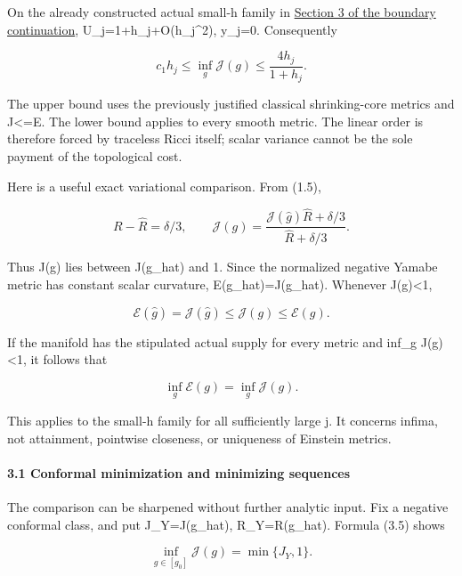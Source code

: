 \documentclass[
  10pt,
]{article}
\begin{document}
On the already constructed actual small-h family in
\href{20260926_boundary_compatibility.md}{Section 3 of the boundary
continuation}, U\_j=1+h\_j+O(h\_j\^{}2), y\_j=0. Consequently

\[
 \boxed{c_1h_j\le\inf_g\mathcal J(g)
                  \le\frac{4h_j}{1+h_j}.}              \tag{3.4}
\]

The upper bound uses the previously justified classical shrinking-core
metrics and J\textless=E. The lower bound applies to every smooth
metric. The linear order is therefore forced by traceless Ricci itself;
scalar variance cannot be the sole payment of the topological cost.

Here is a useful exact variational comparison. From (1.5),

\[
 R-\widehat R=\delta/3,\qquad
 \mathcal J(g)=
 \frac{\mathcal J(\widehat g)\widehat R+\delta/3}
      {\widehat R+\delta/3}.                           \tag{3.5}
\]

Thus J(g) lies between J(g\_hat) and 1. Since the normalized negative
Yamabe metric has constant scalar curvature, E(g\_hat)=J(g\_hat).
Whenever J(g)\textless1,

\[
 \mathcal E(\widehat g)=\mathcal J(\widehat g)
                 \le\mathcal J(g)\le\mathcal E(g).      \tag{3.6}
\]

If the manifold has the stipulated actual supply for every metric and
inf\_g J(g)\textless1, it follows that

\[
                    \inf_g\mathcal E(g)=\inf_g\mathcal J(g).
                                                               \tag{3.7}
\]

This applies to the small-h family for all sufficiently large j. It
concerns infima, not attainment, pointwise closeness, or uniqueness of
Einstein metrics.

\hypertarget{conformal-minimization-and-minimizing-sequences}{%
\paragraph{3.1 Conformal minimization and minimizing
sequences}\label{conformal-minimization-and-minimizing-sequences}}

The comparison can be sharpened without further analytic input. Fix a
negative conformal class, and put J\_Y=J(g\_hat), R\_Y=R(g\_hat).
Formula (3.5) shows

\[
             \inf_{g\in[g_0]}\mathcal J(g)=\min\{J_Y,1\}.
                                                               \tag{3.8}
\]
\end{document}
